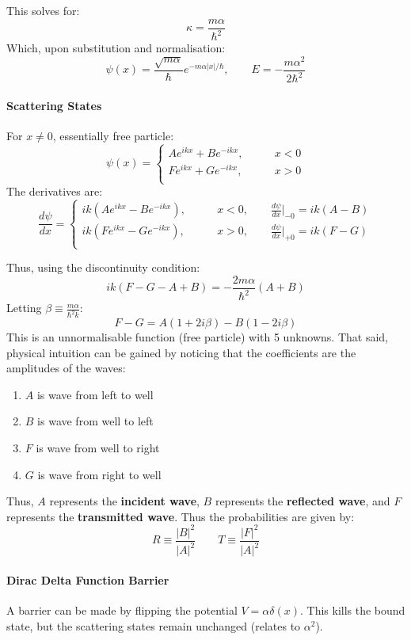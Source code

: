\documentclass[12pt]{article}
\begin{document}
This solves for: 
\[\kappa = \frac{m\alpha}{\hbar^2}\]
Which, upon substitution and normalisation:
\[ \boxed{\psi(x) = \frac{\sqrt{m\alpha}}{\hbar}e^{-m\alpha|x|/\hbar}, \qquad E = -\frac{m\alpha^2}{2\hbar^2}}\]

\paragraph{Scattering States}
For $x\neq 0$, essentially free particle:
\[ 
\psi(x) = 
\left.
\begin{cases}
Ae^{ikx} + Be^{-ikx}, \qquad & x<0\\
Fe^{ikx} + Ge^{-ikx}, \qquad & x> 0\\
\end{cases}
\right.
\]
The derivatives are:
\[ \frac{d\psi}{dx} =
\left.
\begin{cases}
ik(Ae^{ikx} -Be^{-ikx}), \qquad & x<0, \qquad \frac{d\psi}{dx}|_{-0} = ik(A-B)\\
ik(Fe^{ikx} - Ge^{-ikx}), \qquad & x> 0, \qquad \frac{d\psi}{dx}|_{+0} = ik(F-G)\\
\end{cases}
\right.
\]

Thus, using the discontinuity condition:
\[ik(F-G-A+B) = -\frac{2m\alpha}{\hbar^2}(A+B)\] 
Letting \(\beta \equiv \frac{m\alpha}{\hbar^2k}\):
\[ F - G = A(1+2i\beta) - B (1 - 2i\beta)\]
This is an unnormalisable function (free particle) with 5 unknowns. That said, physical intuition can be gained by noticing that the coefficients are the amplitudes of the waves:
\begin{enumerate}
    \item $A$ is wave from left to well
    \item $B$ is wave from well to left
    \item $F$ is wave from well to right
    \item $G$ is wave from right to well
\end{enumerate}
Thus, $A$ represents the \textbf{incident wave}, $B$ represents the \textbf{reflected wave}, and $F$ represents the \textbf{transmitted wave}. Thus the probabilities are given by:
\[R \equiv \frac{|B|^2}{|A|^2} \qquad T \equiv \frac{|F|^2}{|A|^2}\]

\paragraph{Dirac Delta Function Barrier}
A barrier can be made by flipping the potential $V = \alpha \delta(x)$. This kills the bound state, but the scattering states remain unchanged (relates to $\alpha^2$).
\end{document}
